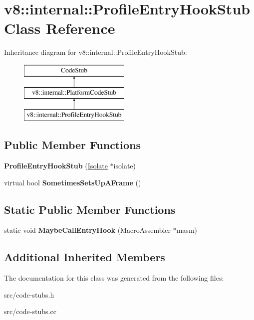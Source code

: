 \hypertarget{classv8_1_1internal_1_1_profile_entry_hook_stub}{}\section{v8\+:\+:internal\+:\+:Profile\+Entry\+Hook\+Stub Class Reference}
\label{classv8_1_1internal_1_1_profile_entry_hook_stub}
Inheritance diagram for v8\+:\+:internal\+:\+:Profile\+Entry\+Hook\+Stub\+:\begin{figure}[H]
\begin{center}
\leavevmode
\includegraphics[height=3.000000cm]{classv8_1_1internal_1_1_profile_entry_hook_stub}
\end{center}
\end{figure}
\subsection*{Public Member Functions}
\begin{DoxyCompactItemize}
\item 
\hypertarget{classv8_1_1internal_1_1_profile_entry_hook_stub_a3f69babf602c7b965d7217fee802181d}{}{\bfseries Profile\+Entry\+Hook\+Stub} (\hyperlink{classv8_1_1internal_1_1_isolate}{Isolate} $\ast$isolate)\label{classv8_1_1internal_1_1_profile_entry_hook_stub_a3f69babf602c7b965d7217fee802181d}

\item 
\hypertarget{classv8_1_1internal_1_1_profile_entry_hook_stub_a146b2fdda50242d2ee172b5fffefd828}{}virtual bool {\bfseries Sometimes\+Sets\+Up\+A\+Frame} ()\label{classv8_1_1internal_1_1_profile_entry_hook_stub_a146b2fdda50242d2ee172b5fffefd828}

\end{DoxyCompactItemize}
\subsection*{Static Public Member Functions}
\begin{DoxyCompactItemize}
\item 
\hypertarget{classv8_1_1internal_1_1_profile_entry_hook_stub_a6bdfae96a00578e973227336f910d6b0}{}static void {\bfseries Maybe\+Call\+Entry\+Hook} (Macro\+Assembler $\ast$masm)\label{classv8_1_1internal_1_1_profile_entry_hook_stub_a6bdfae96a00578e973227336f910d6b0}

\end{DoxyCompactItemize}
\subsection*{Additional Inherited Members}


The documentation for this class was generated from the following files\+:\begin{DoxyCompactItemize}
\item 
src/code-\/stubs.\+h\item 
src/code-\/stubs.\+cc\end{DoxyCompactItemize}
